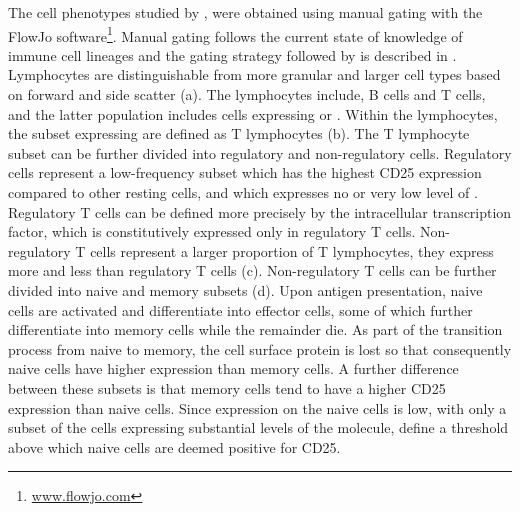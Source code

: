 The cell phenotypes studied by \citet{Dendrou:2009dv}, were obtained using manual gating with the FlowJo software\footnote{\url{www.flowjo.com}}.
Manual gating follows the current state of knowledge of immune cell lineages and the gating strategy followed by \citet{Dendrou:2009dv} is described in .  
Lymphocytes are distinguishable from more granular and larger cell types based on forward and side scatter (a).
The lymphocytes include, B cells and T cells, and the latter population includes cells expressing  or .
Within the lymphocytes, the subset expressing  are defined as T lymphocytes (b).
The \positive T lymphocyte subset can be further divided into regulatory and non-regulatory cells.
Regulatory cells represent a low-frequency subset which has the highest CD25 expression compared to other resting cells, and which
expresses no or very low level of .  
Regulatory T cells can be defined more precisely by the intracellular  transcription factor, which is constitutively expressed
only in regulatory T cells.
Non-regulatory T cells represent a larger proportion of T lymphocytes,
they express more  and less  than regulatory T cells (c).
Non-regulatory T cells can be further divided into naive and memory subsets (d).  
Upon antigen presentation, naive cells are activated and differentiate into effector cells, some of which further differentiate into memory cells
while the remainder die.
As part of the transition process from naive to memory, the cell surface protein  is lost so that consequently naive cells have higher  expression than memory cells.
A further difference between these subsets is that memory cells tend to have a higher CD25 expression than naive cells.
Since  expression on the naive cells is low, with only a subset of the cells expressing substantial levels of the molecule,
\citet{Dendrou:2009dv,Pekalski:2013ga} define a threshold above which naive cells are deemed positive for CD25.


